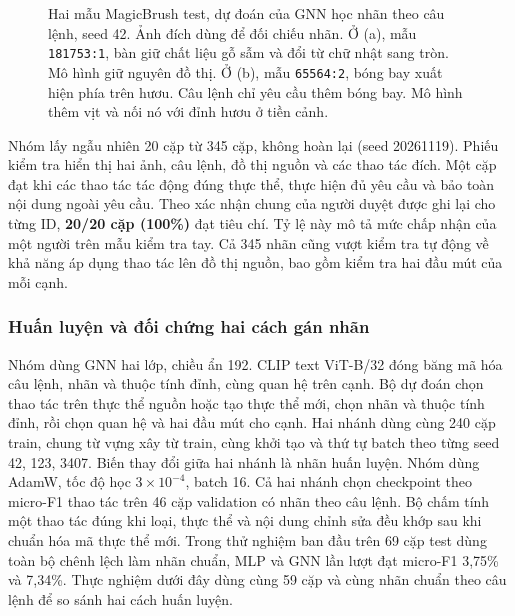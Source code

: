 \begin{figure}[!t]\centering

\caption{Hai mẫu MagicBrush test, dự đoán của GNN học nhãn theo câu lệnh,
seed 42. Ảnh đích dùng để đối chiếu nhãn. Ở (a), mẫu \texttt{181753:1},
bàn giữ chất liệu gỗ sẫm và đổi từ chữ nhật sang tròn. Mô hình giữ nguyên đồ thị.
Ở (b), mẫu \texttt{65564:2}, bóng bay xuất hiện phía trên hươu. Câu lệnh chỉ
yêu cầu thêm bóng bay. Mô hình thêm vịt và nối nó với đỉnh hươu ở tiền cảnh.}
\label{fig:mb-test-errors}
\end{figure}

Nhóm lấy ngẫu nhiên 20 cặp từ 345 cặp, không hoàn lại (seed 20261119).
Phiếu kiểm tra hiển thị hai ảnh, câu lệnh, đồ thị nguồn và các thao tác đích.
Một cặp đạt khi các thao tác tác động đúng thực thể, thực hiện đủ yêu cầu
và bảo toàn nội dung ngoài yêu cầu. Theo xác nhận chung của người duyệt được ghi lại cho từng ID, \textbf{20/20 cặp
(100\%)} đạt tiêu chí. Tỷ lệ này mô tả mức chấp nhận của một người trên mẫu kiểm tra tay.
Cả 345 nhãn cũng vượt kiểm tra tự động về khả năng áp dụng thao tác lên đồ
thị nguồn, bao gồm kiểm tra hai đầu mút của mỗi cạnh.

\subsubsection{Huấn luyện và đối chứng hai cách gán nhãn}
Nhóm dùng GNN hai lớp, chiều ẩn 192. CLIP text ViT-B/32 đóng băng mã hóa câu
lệnh, nhãn và thuộc tính đỉnh, cùng quan hệ trên cạnh. Bộ dự đoán chọn thao
tác trên thực thể nguồn hoặc tạo thực thể mới, chọn nhãn và thuộc tính đỉnh,
rồi chọn quan hệ và hai đầu mút cho cạnh. Hai nhánh dùng cùng 240 cặp train,
chung từ vựng xây từ train, cùng khởi tạo và thứ tự batch theo từng seed
42, 123, 3407. Biến thay đổi giữa hai nhánh là nhãn huấn luyện.
Nhóm dùng AdamW, tốc độ học $3\times10^{-4}$, batch 16. Cả hai nhánh chọn
checkpoint theo micro-F1 thao tác trên 46 cặp validation có nhãn theo câu lệnh.
Bộ chấm tính một thao tác đúng khi loại, thực thể và nội dung chỉnh sửa đều
khớp sau khi chuẩn hóa mã thực thể mới. Trong thử nghiệm ban đầu trên 69
cặp test dùng toàn bộ chênh lệch làm nhãn chuẩn, MLP và GNN lần lượt đạt
micro-F1 3,75\% và 7,34\%. Thực nghiệm dưới đây dùng cùng 59 cặp và
cùng nhãn chuẩn theo câu lệnh để so sánh hai cách huấn luyện.

